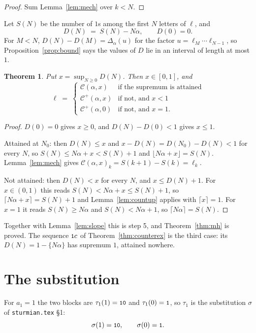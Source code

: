\documentclass[11pt,a4paper]{article}
\newcommand{\seq}[1]{\texttt{\small #1}}
\newcommand{\C}{\mathcal{C}}
\newcommand{\Cp}{\mathcal{C}^{+}}
\theoremstyle{definition}
\theoremstyle{plain}
\newtheorem{theorem}[definition]{Theorem}
\begin{document}
\begin{proof}
Sum Lemma~\ref{lem:mech} over $k < N$.
\end{proof}

Let $S(N)$ be the number of $1$s among the first $N$ letters of $\ell$, and
\[
  D(N) \;=\; S(N) - N\alpha, \qquad D(0) = 0 .
\]
For $M < N$, $D(N) - D(M) = \Delta_\alpha(u)$ for the factor $u = \ell_M \cdots
\ell_{N-1}$, so Proposition~\ref{prop:bound} says the values of $D$ lie in an
interval of length at most $1$.

\begin{theorem}\label{thm:step5}
Put $x = \sup_{N \geq 0} D(N)$. Then $x \in [0,1]$, and
\[
  \ell \;=\; \begin{cases}
    \C(\alpha, x) & \text{if the supremum is attained} \\
    \Cp(\alpha, x) & \text{if not, and } x < 1 \\
    \Cp(\alpha, 0) & \text{if not, and } x = 1 .
  \end{cases}
\]
\end{theorem}

\begin{proof}
$D(0) = 0$ gives $x \geq 0$, and $D(N) - D(0) < 1$ gives $x \leq 1$.

Attained at $N_0$: then $D(N) \leq x$ and $x - D(N) = D(N_0) - D(N) < 1$ for
every $N$, so $S(N) \leq N\alpha + x < S(N)+1$ and
$\lfloor N\alpha + x\rfloor = S(N)$. Lemma~\ref{lem:mech} gives
$\C(\alpha,x)_k = S(k+1) - S(k) = \ell_k$.

Not attained: then $D(N) < x$ for every $N$, and $x \leq D(N) + 1$. For
$x \in (0,1)$ this reads $S(N) < N\alpha + x \leq S(N)+1$, so
$\lceil N\alpha + x\rceil = S(N) + 1$ and Lemma~\ref{lem:countup} applies with
$\lceil x\rceil = 1$. For $x = 1$ it reads $S(N) \geq N\alpha$ and
$S(N) < N\alpha + 1$, so $\lceil N\alpha \rceil = S(N)$.
\end{proof}

Together with Lemma~\ref{lem:slope} this is step 5, and
Theorem~\ref{thm:mh} is proved. The sequence $\seq{1}c$ of
Theorem~\ref{thm:counterex} is the third case: its $D(N) = 1 - \{N\alpha\}$ has
supremum $1$, attained nowhere.

\section{The substitution}

For $a_1 = 1$ the two blocks are $\tau_1(1) = \seq{10}$ and $\tau_1(0) = \seq{1}$,
so $\tau_1$ is the substitution $\sigma$ of \texttt{sturmian.tex} \S1:
\[
  \sigma(1) = \seq{10}, \qquad \sigma(0) = \seq{1} .
\]
\end{document}
